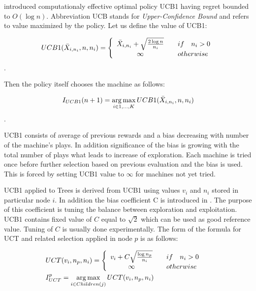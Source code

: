  introduced computationaly effective optimal policy UCB1 \cite{Auer2002} 
having regret bounded to $O(\log{n})$. Abbreviation UCB stands for \emph{Upper-Confidence Bound}
and refers to value maximized by the policy. Let us define the value of UCB1:

\begin{equation}
UCB1(\bar{X}_{i,n_i},n,n_i) = 
    \left\{
        \begin{array}{c@{\quad\quad}l}
            \bar{X}_{i,n_i} + \sqrt{{2 \log{n}} \over n_i} & if \quad n_i > 0 \\
            \infty & otherwise \\
        \end{array}
    \right.
\end{equation}.


Then the policy itself chooses the machine as follows:

\begin{equation}
 I_{UCB1}(n+1) = \operatorname*{arg\,max}\limits_{i\in{1,\ldots,K}} UCB1(\bar{X}_{i,n_i},n,n_i)
 \end{equation}.

UCB1 consists of average of previous rewards and a bias decreasing with number of the
machine's plays. In addition significance of the bias is growing with the total number of plays
what
leads to increase of exploration. Each machine is tried once before further selection based on
previous evaluation and the bias is used. This is forced by setting UCB1 value to $\infty$ for
machines not yet tried.

UCB1 applied to Trees \cite{Kocsis2006} is derived from UCB1 using values $v_i$ and $n_i$ stored in
particular node $i$. In addition the bias coefficient C is introduced in \cite{Chaslot2008}.
The purpose of this coefficient is tuning the balance between exploration and exploitation.
UCB1 contains fixed value of $C$ equal to $\sqrt{2}$ which can be used as good reference value.
Tuning of $C$ is usually done 
experimentally. The form of the formula for UCT and related selection applied in node $p$ is as
follows:

\begin{align}
    &\begin{aligned}
UCT(v_i,n_p,n_i) &= \left\{
        \begin{array}{c@{\quad\quad}l}
            v_i + C \sqrt{{\log{n_p}} \over n_i} & if \quad n_i > 0 \\
            \infty & otherwise \\
        \end{array}
    \right.
    \end{aligned}\\
    &\begin{aligned}
I_{UCT}^p &= \argmax\limits_{i \in Children(j)} UCT(v_i, n_p, n_i)
    \end{aligned}
\end{align}



